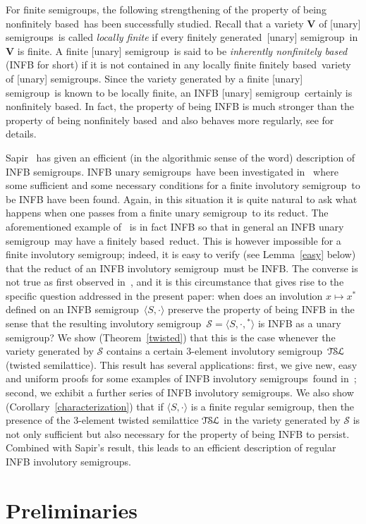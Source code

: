 \documentclass[smallextended]{svjour3}
\newcommand{\sgp}{semi\-group}
\newcommand{\sgps}{semi\-groups}
\newcommand{\is}{involutory semi\-group}
\newcommand{\iss}{involutory semi\-groups}
\newcommand{\fis}{finite involutory semi\-group}
\newcommand{\fss}{finite \sgps}
\newcommand{\fus}{finite unary \sgp}
\newcommand{\fb}{finitely based}
\newcommand{\fg}{finitely generated}
\newcommand{\nfb}{non\-finitely based}
\newcommand{\infb}{inherently non\-finitely based}
\newcommand{\TSL}{\ensuremath{\mathcal{T\kern-.5pt S\kern-.5pt L}}}
\begin{document}
For \fss, the following strengthening of the property of being \nfb\ has been successfully studied. Recall that a variety $\mathbf{V}$ of
[unary] \sgps\ is called \emph{locally finite} if every \fg\ [unary] \sgp\ in $\mathbf{V}$ is finite. A finite [unary] \sgp\ is said to be
\emph{\infb} (INFB for short) if it is not contained in any locally finite \fb\ variety of [unary] \sgps. Since the variety generated by a
finite [unary] \sgp\ is known to be locally finite, an INFB [unary] \sgp\ certainly is \nfb. In fact, the property of being INFB is much
stronger than the property of being \nfb\ and also behaves more regularly, see \cite{Volkov:2001} for details.

Sapir~\cite{Sapir:1987} has given an efficient (in the algorithmic sense of the word) description of INFB \sgps. INFB unary \sgps\ have
been investigated in~\cite{Dolinka:2010,ADV:2012} where some sufficient and some necessary conditions for a \fis\ to be INFB have been
found. Again, in this situation it is quite natural to ask what happens when one passes from a \fus\ to its reduct. The aforementioned
example of~\cite{Lawrence&Willard:1998} is in fact INFB so that in general an INFB unary \sgp\ may have a \fb\ reduct. This is however
impossible for a \fis; indeed, it is easy to verify (see Lemma~\ref{easy} below) that the reduct of an INFB \is\ must be INFB. The converse
is not true as first observed in~\cite{Sapir:1993}, and it is this circumstance that gives rise to the specific question addressed in the
present paper: when does an involution $x\mapsto x^*$ defined on an INFB \sgp\ $\langle S,\cdot\rangle$ preserve the property of being INFB
in the sense that the resulting \is\ $\mathcal{S}=\langle S,\cdot,{}^*\rangle$ is INFB as a unary \sgp?  We show (Theorem~\ref{twisted})
that this is the case whenever the variety generated by $\mathcal{S}$ contains a certain 3-element \is\ $\TSL$ (twisted semilattice). This
result has several applications: first, we give new, easy and uniform proofs for some examples of INFB \iss\ found in~\cite{ADV:2012};
second, we exhibit a further series of INFB \iss. We also show (Corollary~\ref{characterization}) that if $\langle S,\cdot\rangle$ is a finite regular
\sgp, then the presence of the 3-element twisted semilattice $\TSL$ in the variety generated by $\mathcal{S}$ is not only sufficient but
also necessary for the property of being INFB to persist. Combined with Sapir's result, this leads to an efficient description of regular
INFB \iss.

\section{Preliminaries}
\label{sec:preliminaries}
\end{document}
